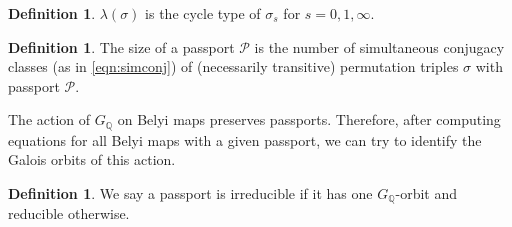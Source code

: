 \documentclass{dcthesis}
\newcommand{\QQ}{\mathbb Q}
\newcommand{\defi}[1]{\textsf{#1}}
\numberwithin{equation}{section}
\theoremstyle{definition}
\newtheorem{definition}[equation]{Definition}
\theoremstyle{remark}
\begin{document}
{{\begin{definition}
      $\lambda(\sigma)$ is the cycle type of $\sigma_s$ for $s=0,1,\infty$.
    \end{definition}
    \begin{definition}
      \label{def:passportsize}
      The
      \defi{size} of a passport $\mathcal{P}$ is the number of simultaneous conjugacy
      classes (as in \ref{eqn:simconj}) of (necessarily transitive) permutation
      triples $\sigma$ with passport $\mathcal{P}$.
    \end{definition}
    The action of $G_\QQ$ on Belyi maps preserves passports.
    Therefore, after computing equations for all Belyi maps with a given
    passport, we can try to identify the Galois orbits of this action.
    \begin{definition}
      \label{def:reduciblepassport}
      We say a passport is \defi{irreducible} if it has one
      $G_\QQ$-orbit and
      \defi{reducible} otherwise.
    \end{definition}
  }
}
\end{document}
